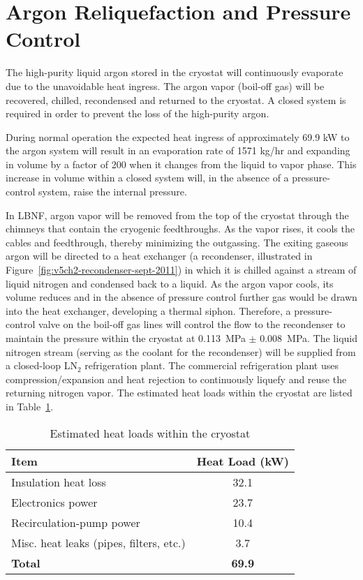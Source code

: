 \section{Argon Reliquefaction and Pressure Control}
\label{subsec:reliquef}

The high-purity liquid argon stored in the cryostat will 
continuously evaporate due to the unavoidable heat ingress.  
The argon vapor (boil-off gas) will be recovered, chilled, 
recondensed and returned to the cryostat. A closed system 
is required in order to prevent the loss of the high-purity argon.

During normal operation the expected heat ingress of approximately 
69.9 kW to the argon system will result in 
an evaporation rate of 1571 kg/hr and expanding in volume by a 
factor of 200 when it changes from the liquid to vapor phase. 
This increase in volume within a closed system will, in the 
absence of a pressure-control system, raise the internal pressure.

In LBNF, argon vapor will be removed from the top of the cryostat 
through the chimneys that contain the cryogenic feedthroughs. As 
the vapor rises, it cools the cables and feedthrough, thereby 
minimizing the outgassing. The exiting gaseous argon will be 
directed to a heat exchanger (a recondenser, illustrated in 
Figure~\ref{fig:v5ch2-recondenser-sept-2011}) in which it is 
chilled against a stream of liquid nitrogen and condensed 
back to a liquid. As the argon vapor cools, its volume 
reduces and in the absence of pressure control further 
gas would be drawn into the heat exchanger, developing 
a thermal siphon.  Therefore, a pressure-control valve on 
the boil-off gas lines will control the flow to the recondenser 
to maintain the pressure within the cryostat at 0.113~MPa $\pm$ 0.008~MPa.  
The liquid nitrogen stream (serving as the coolant for the 
recondenser) will be supplied from a closed-loop LN$_{2}$ refrigeration plant.  
The commercial refrigeration plant uses compression/expansion and heat 
rejection to continuously liquefy and reuse the returning nitrogen 
vapor. The estimated heat loads within the cryostat are listed 
in Table~\ref{table:cryo-heat-loads}.
 
\begin{table}
\centering
\caption{Estimated heat loads within the cryostat}
\label{table:cryo-heat-loads}
\begin{tabular}[htbp]{|l|c|}
\hline
{\bf Item} & {\bf Heat Load (kW)}\\
\hline\hline
Insulation heat loss & 32.1  \\
\hline
Electronics power & 23.7  \\
\hline
Recirculation-pump power & 10.4 \\
\hline
Misc. heat leaks (pipes, filters, etc.) & 3.7 \\
\hline\hline
{\bf Total} & {\bf 69.9 } \\
\hline
\end{tabular} 
\end{table}

